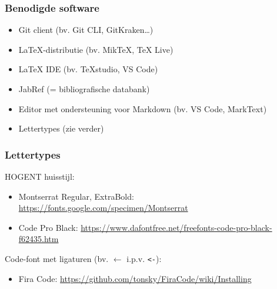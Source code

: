 \documentclass[aspectratio=169]{beamer}
\begin{document}
\begin{frame}
  \frametitle{Benodigde software}

  \begin{itemize}
    \item Git client (bv. Git CLI, GitKraken\ldots)
    \item \LaTeX-distributie (bv. MikTeX, TeX Live)
    \item {\LaTeX} IDE (bv. {\TeX}studio, VS Code)
    \item JabRef (= bibliografische databank)
    \item Editor met ondersteuning voor Markdown (bv. VS Code, MarkText)
    \item Lettertypes (zie verder)
  \end{itemize}

  \bigskip
\end{frame}

\begin{frame}[fragile]
  \frametitle{Lettertypes}

  HOGENT huisstijl:

  \begin{itemize}
    \item Montserrat Regular, ExtraBold: \url{https://fonts.google.com/specimen/Montserrat}
    \item Code Pro Black: \url{https://www.dafontfree.net/freefonts-code-pro-black-f62435.htm}
  \end{itemize}

  Code-font met ligaturen (bv. \({\leftarrow}\) i.p.v. \verb|<-|):

  \begin{itemize}
    \item Fira Code: \url{https://github.com/tonsky/FiraCode/wiki/Installing}
  \end{itemize}
\end{frame}
\end{document}

